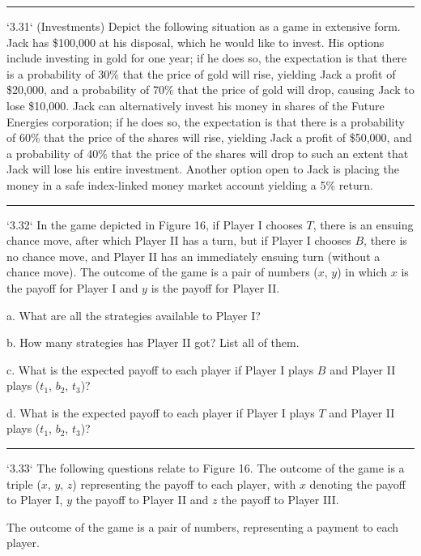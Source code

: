 \documentclass[10pt]{report}
\begin{document}
\vspace{0.5cm}
\hrule
\vspace{0.5cm}
`3.31` (Investments) Depict the following situation as a game in extensive form. Jack has \$100,000 at his disposal, which he would like to invest. His options include investing in gold for one year; if he does so, the expectation is that there is a probability of 30\% that the price of gold will rise, yielding Jack a profit of \$20,000, and a probability of 70\% that the price of gold will drop, causing Jack to lose \$10,000. Jack can alternatively invest his money in shares of the Future Energies corporation; if he does so, the expectation is that there is a probability of 60\% that the price of the shares will rise, yielding Jack a profit of \$50,000, and a probability of 40\% that the price of the shares will drop to such an extent that Jack will lose his entire investment. Another option open to Jack is placing the money in a safe index-linked money market account yielding a 5\% return.

\vspace{0.5cm}
\hrule
\vspace{0.5cm}
`3.32` In the game depicted in Figure 16, if Player I chooses $T$, there is an ensuing chance move, after which Player II has a turn, but if Player I chooses $B$, there is no chance move, and Player II has an immediately ensuing turn (without a chance move). The outcome of the game is a pair of numbers ($x$, $y$) in which $x$ is the payoff for Player I and $y$ is the payoff for Player II.

a. What are all the strategies available to Player I?

b. How many strategies has Player II got? List all of them.

c. What is the expected payoff to each player if Player I plays $B$ and Player II plays ($t_{1}$, $b_{2}$, $t_{3}$)?

d. What is the expected payoff to each player if Player I plays $T$ and Player II plays ($t_{1}$, $b_{2}$, $t_{3}$)?

\vspace{0.5cm}
\hrule
\vspace{0.5cm}
`3.33` The following questions relate to Figure 16. The outcome of the game is a triple ($x$, $y$, $z$) representing the payoff to each player, with $x$ denoting the payoff to Player I, $y$ the payoff to Player II and $z$ the payoff to Player III.

The outcome of the game is a pair of numbers, representing a payment to each player.
\end{document}
